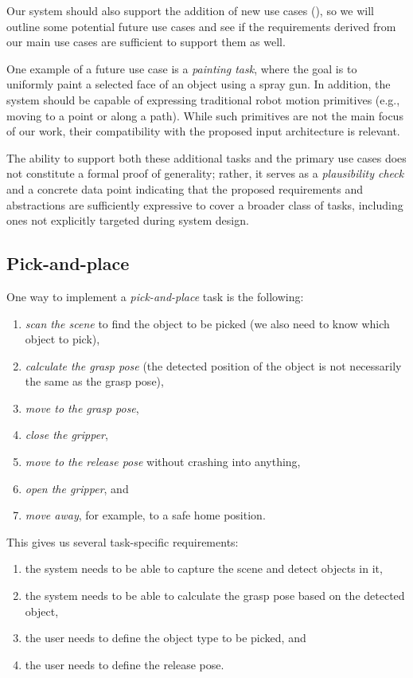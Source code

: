 Our system should also support the addition of new use cases (), so we will outline some potential future use cases and see if the requirements derived from our main use cases are sufficient to support them as well. 

One example of a future use case is a \emph{painting task}, where the goal is to uniformly paint a selected face of an object using a spray gun. In addition, the system should be capable of expressing traditional robot motion primitives (e.g., moving to a point or along a path). While such primitives are not the main focus of our work, their compatibility with the proposed input architecture is relevant.

The ability to support both these additional tasks and the primary use cases does not constitute a formal proof of generality; rather, it serves as a \emph{plausibility check} and a concrete data point indicating that the proposed requirements and abstractions are sufficiently expressive to cover a broader class of tasks, including ones not explicitly targeted during system design.

\subsection{Pick-and-place} \label{subsec:ch2_analysis_pick_and_place}

One way to implement a \emph{pick-and-place} task is the following:
\begin{enumerate}[label=(\arabic*), itemsep=0.2em]
    \item \emph{scan the scene} to find the object to be picked (we also need to know which object to pick),
    \item \emph{calculate the grasp pose} (the detected position of the object is not necessarily the same as the grasp pose),
    \item \emph{move to the grasp pose},
    \item \emph{close the gripper},
    \item \emph{move to the release pose} without crashing into anything,
    \item \emph{open the gripper}, and
    \item \emph{move away}, for example, to a safe home position.
\end{enumerate}

This gives us several task-specific requirements:
\begin{enumerate}[label=(\roman*), itemsep=0.2em]
    \item the system needs to be able to capture the scene and detect objects in it, \label{req:scene_detection}
    \item the system needs to be able to calculate the grasp pose based on the detected object, \label{req:grasp_calculation}
    \item the user needs to define the object type to be picked, and \label{req:object_type}
    \item the user needs to define the release pose. \label{req:release_pose}
\end{enumerate}

